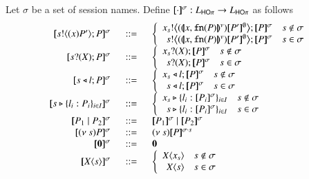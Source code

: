 \begin{definition}\label{d:trabs}
   Let $\sigma$ be a set of session names.
	Define $[\!\![\cdot]\!\!]^{\sigma}: L_{\mathsf{HO}\pi} \to L_{\mathsf{HO}\pi}$  as follows
	\[
	\begin{array}{rcll}
		\map{\bout{s}{\abs{x} P'} P}^{\sigma} &\bnfis&
		\left\{
		\begin{array}{rl}
			\bbout{x_s}{\abs{\vmap{x, \fn{P}}} \map{P'}^{\es}} \map{P}^{\sigma} & s \notin \sigma\\
			\bbout{s}{\abs{\vmap{x, \fn{P}}} \map{P'}^{\es}} \map{P}^{\sigma} & s \in \sigma
		\end{array}
		\right.
		\\
		\map{\binp{s}{X} P}^{\sigma} &\bnfis&
		\left\{
		\begin{array}{rl}
			\binp{x_s}{X} \map{P}^{\sigma} & s \notin \sigma\\
			\binp{s}{X} \map{P}^{\sigma} & s \in \sigma
		\end{array}
		\right.
		\\
		\map{\bsel{s}{l} P}^{\sigma} &\bnfis&
		\left\{
		\begin{array}{rl}
			\bsel{x_s}{l} \map{P}^{\sigma} & s \notin \sigma\\
			\bsel{s}{l} \map{P}^{\sigma} & s \in \sigma
		\end{array}
		\right.
		\\

		\map{\bbra{s}{l_i: P_i}_{i \in I}}^{\sigma} &\bnfis&
		\left\{
		\begin{array}{rl}
			\bbra{x_s}{l_i: \map{P_i}^{\sigma}}_{i \in I} & s \notin \sigma\\
			\bbra{s}{l_i: \map{P_i}^{\sigma}}_{i \in I} & s \in \sigma\\
		\end{array}
		\right.
		\\
		\map{P_1 \Par P_2}^{\sigma} &\bnfis& \map{P_1}^{\sigma} \Par \map{P_2}^{\sigma} \\%
		\map{\news{s} P}^{\sigma} &\bnfis& \news{s} \map{P}^{\sigma\cat s}\\
		\map{\inact}^{\sigma} &\bnfis& \inact\\
		\map{\appl{\X}{s}}^{\sigma} &\bnfis&
		\left\{
		\begin{array}{rl}
			\appl{\X}{x_s} & s \notin \sigma\\
			\appl{\X}{s} & s \in \sigma\\
		\end{array}
		\right.
	\end{array}
\]

\end{definition}

